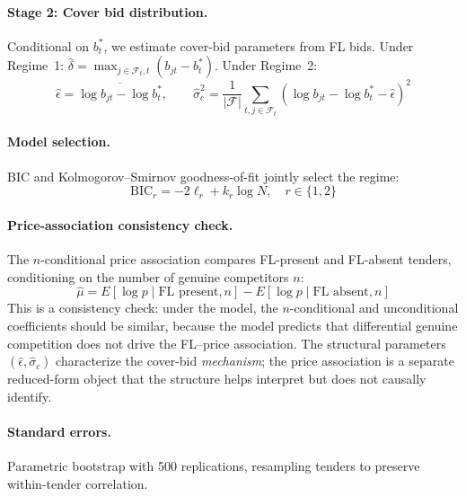 \paragraph{Stage 2: Cover bid distribution.}
Conditional on $b^*_t$, we estimate cover-bid parameters from FL bids.
Under Regime~1: $\hat{\delta} = \max_{j \in \mathcal{F}_t, t}
(b_{jt} - b^*_t)$. Under Regime~2:
\begin{equation}
  \hat{\epsilon} = \overline{\log b_{jt} - \log b^*_t}, \qquad
  \hat{\sigma}_c^2 = \frac{1}{|\mathcal{F}|}
  \sum_{t,j \in \mathcal{F}_t}
  \left(\log b_{jt} - \log b^*_t - \hat{\epsilon}\right)^2
  \label{eq:mle_cover}
\end{equation}

\paragraph{Model selection.}
BIC and Kolmogorov--Smirnov goodness-of-fit jointly select the
regime:
\begin{equation}
  \text{BIC}_r = -2\ell_r + k_r \log N, \quad r \in \{1, 2\}
  \label{eq:bic}
\end{equation}

\paragraph{Price-association consistency check.}
The $n$-conditional price association compares FL-present and
FL-absent tenders, conditioning on the number of genuine competitors
$n$:
\begin{equation}
  \hat{\mu} = E[\log p \mid \text{FL present}, n] -
  E[\log p \mid \text{FL absent}, n]
  \label{eq:structural_markup}
\end{equation}
This is a consistency check: under the model, the $n$-conditional
and unconditional coefficients should be similar, because the model
predicts that differential genuine competition does not drive the
FL--price association. The structural parameters
$(\hat{\epsilon}, \hat{\sigma}_c)$ characterize the cover-bid
\emph{mechanism}; the price association is a separate reduced-form
object that the structure helps interpret but does not causally
identify.

\paragraph{Standard errors.}
Parametric bootstrap with 500 replications, resampling tenders to
preserve within-tender correlation.

